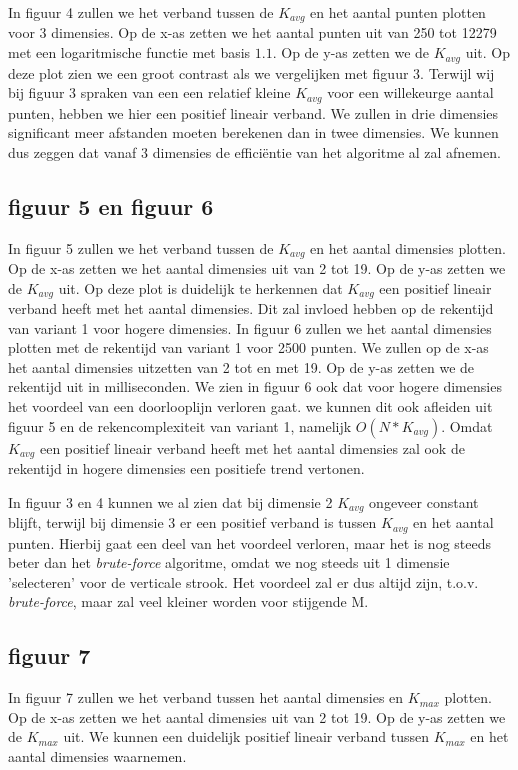 \documentclass[12pt]{article}
\begin{document}
In figuur 4 zullen we het verband tussen de $K_{avg}$ en het aantal punten plotten voor 3 dimensies.
Op de x-as zetten we het aantal punten uit van 250 tot 12279 met een logaritmische functie met basis $1.1$.
Op de y-as zetten we de $K_{avg}$ uit.
Op deze plot zien we een groot contrast als we vergelijken met figuur 3.
Terwijl wij bij figuur 3 spraken van een een relatief kleine $K_{avg}$ voor een willekeurge aantal punten, hebben we hier een positief lineair verband.
We zullen in drie dimensies significant meer afstanden moeten berekenen dan in twee dimensies.
We kunnen dus zeggen dat vanaf 3 dimensies de efficiëntie van het algoritme al zal afnemen.

\subsection{figuur 5 en figuur 6}
In figuur 5 zullen we het verband tussen de $K_{avg}$ en het aantal dimensies plotten.
Op de x-as zetten we het aantal dimensies uit van 2 tot 19.
Op de y-as zetten we de $K_{avg}$ uit.
Op deze plot is duidelijk te herkennen dat $K_{avg}$ een positief lineair verband heeft met het aantal dimensies.
Dit zal invloed hebben op de rekentijd van variant 1 voor hogere dimensies.
In figuur 6 zullen we het aantal dimensies plotten met de rekentijd van variant 1 voor 2500 punten.
We zullen op de x-as het aantal dimensies uitzetten van 2 tot en met 19.
Op de y-as zetten we de rekentijd uit in milliseconden.
We zien in figuur 6 ook dat voor hogere dimensies het voordeel van een doorlooplijn verloren gaat.
we kunnen dit ook afleiden uit figuur 5 en de rekencomplexiteit van variant 1, namelijk $O(N*K_{avg})$.
Omdat $K_{avg}$ een positief lineair verband heeft met het aantal dimensies zal ook de rekentijd in hogere dimensies een positiefe trend vertonen.

\newpage
In figuur 3 en 4 kunnen we al zien dat bij dimensie 2 $K_{avg}$ ongeveer constant blijft, terwijl bij dimensie 3 er een positief verband is tussen $K_{avg}$ en het aantal punten.
Hierbij gaat een deel van het voordeel verloren, maar het is nog steeds beter dan het \textit{brute-force} algoritme, omdat we nog steeds uit 1 dimensie 'selecteren' voor de verticale strook.
Het voordeel zal er dus altijd zijn, t.o.v. \textit{brute-force}, maar zal veel kleiner worden voor stijgende M.

\subsection{figuur 7}
In figuur 7 zullen we het verband tussen het aantal dimensies en $K_{max}$ plotten.
Op de x-as zetten we het aantal dimensies uit van 2 tot 19.
Op de y-as zetten we de $K_{max}$ uit.
We kunnen een duidelijk positief lineair verband tussen $K_{max}$ en het aantal dimensies waarnemen.
\end{document}
